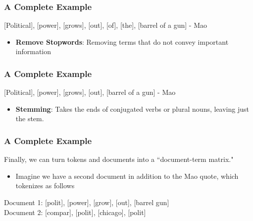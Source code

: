 \documentclass[compress, aspectratio=54]{beamer}
\begin{document}

\begin{frame}
\frametitle{A Complete Example}
[Political], [power], [grows], [out], {\color{red} [of], [the],} [barrel of a gun] - Mao
\begin{itemize}

\item \textbf{Remove Stopwords}: Removing terms that do not convey important information
\end{itemize}

\end{frame}

\begin{frame}
\frametitle{A Complete Example}
[Polit{\color{red}ical}], [power], [grow{\color{red}s}], [out], [barrel {\color{red}of a} gun] - Mao
\begin{itemize}

\item \textbf{Stemming}: Takes the ends of conjugated verbs or plural nouns, leaving just the stem.
\end{itemize}
\end{frame}


\begin{frame}
\frametitle{A Complete Example}
Finally, we can turn tokens and documents into a ``document-term
matrix."
\begin{itemize}
\item Imagine we have a second document in addition to the Mao quote, which
tokenizes as follows
\end{itemize}

Document 1: [polit], [power], [grow], [out], [barrel gun] \\
Document 2: [compar], [polit], [chicago], [polit]\\

\end{frame}


\end{document}
